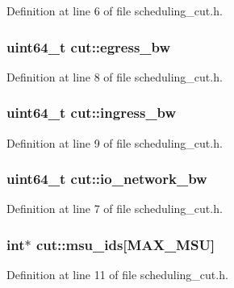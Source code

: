 Definition at line 6 of file scheduling\-\_\-cut.\-h.

\hypertarget{structcut_a8d676e103e1e29912c606f34ab34c5cf}{
\subsubsection[{egress\-\_\-bw}]{\setlength{\rightskip}{0pt plus 5cm}uint64\-\_\-t cut\-::egress\-\_\-bw}}\label{structcut_a8d676e103e1e29912c606f34ab34c5cf}


Definition at line 8 of file scheduling\-\_\-cut.\-h.

\hypertarget{structcut_a3fbcce011fd7ee1410f7fbf2fa27f293}{
\subsubsection[{ingress\-\_\-bw}]{\setlength{\rightskip}{0pt plus 5cm}uint64\-\_\-t cut\-::ingress\-\_\-bw}}\label{structcut_a3fbcce011fd7ee1410f7fbf2fa27f293}


Definition at line 9 of file scheduling\-\_\-cut.\-h.

\hypertarget{structcut_a3c0344ad7e8725763aebacac3632b0a6}{
\subsubsection[{io\-\_\-network\-\_\-bw}]{\setlength{\rightskip}{0pt plus 5cm}uint64\-\_\-t cut\-::io\-\_\-network\-\_\-bw}}\label{structcut_a3c0344ad7e8725763aebacac3632b0a6}


Definition at line 7 of file scheduling\-\_\-cut.\-h.

\hypertarget{structcut_abdfeb0b19bcc94fc210767f519777a3f}{
\subsubsection[{msu\-\_\-ids}]{\setlength{\rightskip}{0pt plus 5cm}int$\ast$ cut\-::msu\-\_\-ids\mbox{[}{\bf M\-A\-X\-\_\-\-M\-S\-U}\mbox{]}}}\label{structcut_abdfeb0b19bcc94fc210767f519777a3f}


Definition at line 11 of file scheduling\-\_\-cut.\-h.

